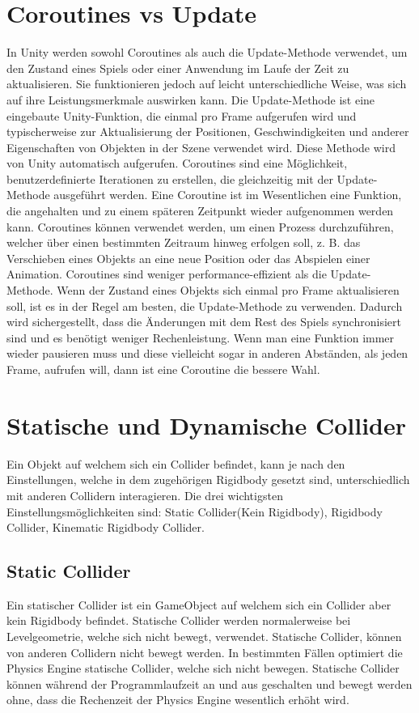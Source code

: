 \section{Coroutines vs Update}
In Unity werden sowohl Coroutines als auch die Update-Methode verwendet, um den Zustand eines Spiels oder einer Anwendung im Laufe der Zeit zu aktualisieren. Sie funktionieren jedoch auf leicht unterschiedliche Weise, was sich auf ihre Leistungsmerkmale auswirken kann. Die Update-Methode ist eine eingebaute Unity-Funktion, die einmal pro Frame aufgerufen wird und typischerweise zur Aktualisierung der Positionen, Geschwindigkeiten und anderer Eigenschaften von Objekten in der Szene verwendet wird. Diese Methode wird von Unity automatisch aufgerufen. Coroutines sind eine Möglichkeit, benutzerdefinierte Iterationen zu erstellen, die gleichzeitig mit der Update-Methode ausgeführt werden. Eine Coroutine ist im Wesentlichen eine Funktion, die angehalten und zu einem späteren Zeitpunkt wieder aufgenommen werden kann. Coroutines können verwendet werden, um einen Prozess durchzuführen, welcher über einen bestimmten Zeitraum hinweg erfolgen soll, z. B. das Verschieben eines Objekts an eine neue Position oder das Abspielen einer Animation. Coroutines sind weniger performance-effizient als die Update-Methode. Wenn der Zustand eines Objekts sich einmal pro Frame aktualisieren soll, ist es in der Regel am besten, die Update-Methode zu verwenden. Dadurch wird sichergestellt, dass die Änderungen mit dem Rest des Spiels synchronisiert sind und es benötigt weniger Rechenleistung. Wenn man eine Funktion immer wieder pausieren muss und diese vielleicht sogar in anderen Abständen, als jeden Frame, aufrufen will, dann ist eine Coroutine die bessere Wahl.
\cite{dickinson2015unity}

\section{Statische und Dynamische Collider}
Ein Objekt auf welchem sich ein Collider befindet, kann je nach den Einstellungen, welche in dem zugehörigen Rigidbody gesetzt sind, unterschiedlich mit anderen Collidern interagieren. Die drei wichtigsten Einstellungsmöglichkeiten sind: Static Collider(Kein Rigidbody), Rigidbody Collider, Kinematic Rigidbody Collider.

\subsection{Static Collider}
Ein statischer Collider ist ein GameObject auf welchem sich ein Collider aber kein Rigidbody befindet. Statische Collider werden normalerweise bei Levelgeometrie, welche sich nicht bewegt, verwendet. Statische Collider, können von anderen Collidern nicht bewegt werden. In bestimmten Fällen optimiert die Physics Engine statische Collider, welche sich nicht bewegen. Statische Collider können während der Programmlaufzeit an und aus geschalten und bewegt werden ohne, dass die Rechenzeit der Physics Engine wesentlich erhöht wird.

